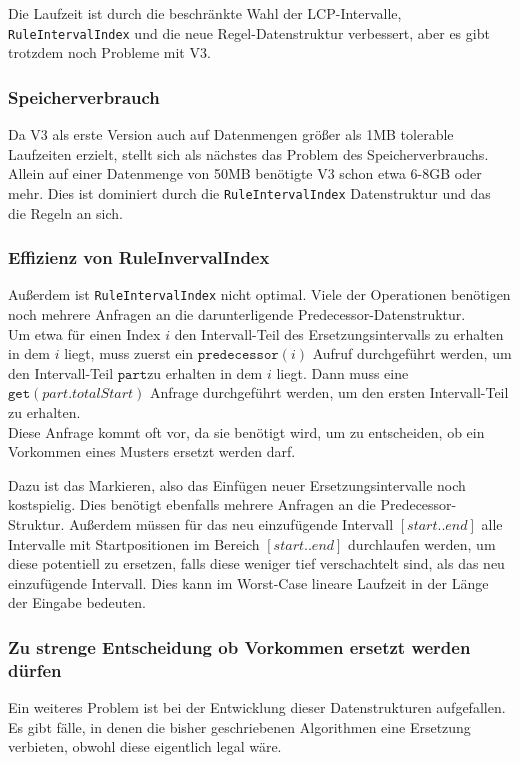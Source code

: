 Die Laufzeit ist durch die beschränkte Wahl der LCP-Intervalle, \texttt{RuleIntervalIndex} und die neue Regel-Datenstruktur verbessert, aber es gibt trotzdem noch Probleme mit V3. 

\subsubsection{Speicherverbrauch}
Da V3 als erste Version auch auf Datenmengen größer als 1MB tolerable Laufzeiten erzielt, stellt sich als nächstes das Problem des Speicherverbrauchs. Allein auf einer Datenmenge von 50MB benötigte V3 schon etwa 6-8GB oder mehr. Dies ist dominiert durch die \texttt{RuleIntervalIndex} Datenstruktur und das die Regeln an sich.

\subsubsection{Effizienz von RuleInvervalIndex}

Außerdem ist \texttt{RuleIntervalIndex} nicht optimal. Viele der Operationen benötigen noch mehrere Anfragen an die darunterligende Predecessor-Datenstruktur.\\
Um etwa für einen Index $i$ den Intervall-Teil des Ersetzungsintervalls zu erhalten in dem $i$ liegt, muss zuerst ein $\texttt{predecessor}(i)$ Aufruf durchgeführt werden, um den Intervall-Teil $\texttt{part}$zu erhalten in dem $i$ liegt. Dann muss eine $\texttt{get}(part.totalStart)$ Anfrage durchgeführt werden, um den ersten Intervall-Teil zu erhalten.\\
Diese Anfrage kommt oft vor, da sie benötigt wird, um zu entscheiden, ob ein Vorkommen eines Musters ersetzt werden darf.

Dazu ist das Markieren, also das Einfügen neuer Ersetzungsintervalle noch kostspielig. Dies benötigt ebenfalls mehrere Anfragen an die Predecessor-Struktur. Außerdem müssen für das neu einzufügende Intervall $[start.. end]$ alle Intervalle mit Startpositionen im Bereich $[start.. end]$ durchlaufen werden, um diese potentiell zu ersetzen, falls diese weniger tief verschachtelt sind, als das neu einzufügende Intervall. Dies kann im Worst-Case lineare Laufzeit in der Länge der Eingabe bedeuten.

\subsubsection{Zu strenge Entscheidung ob Vorkommen ersetzt werden dürfen}
\label{strictdecision}
Ein weiteres Problem ist bei der Entwicklung dieser Datenstrukturen aufgefallen. Es gibt fälle, in denen die bisher geschriebenen Algorithmen eine Ersetzung verbieten, obwohl diese eigentlich legal wäre.


